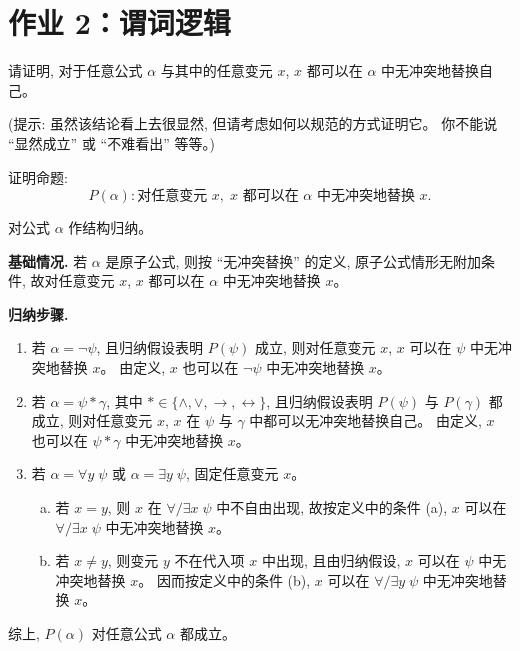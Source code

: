 
\newpage
\section{作业 2：谓词逻辑}

\begin{problem}[一阶谓词逻辑: 替换]
  请证明, 对于任意公式 $\alpha$ 与其中的任意变元 $x$,
  $x$ 都可以在 $\alpha$ 中无冲突地替换自己。

  \noindent (提示: 虽然该结论看上去很显然, 但请考虑如何以规范的方式证明它。
  你不能说 ``显然成立'' 或 ``不难看出'' 等等。)
\end{problem}

\begin{solution}
  证明命题:
  \[
    P(\alpha): \text{对任意变元 } x,\; x \text{ 都可以在 } \alpha \text{ 中无冲突地替换 } x.
  \]

  对公式 $\alpha$ 作结构归纳。

  \textbf{基础情况.}
  若 $\alpha$ 是原子公式, 则按 ``无冲突替换'' 的定义,
  原子公式情形无附加条件, 故对任意变元 $x$,
  $x$ 都可以在 $\alpha$ 中无冲突地替换 $x$。

  \textbf{归纳步骤.}

  \begin{enumerate}[(1)]
    \item 若 $\alpha = \lnot \psi$,
      且归纳假设表明 $P(\psi)$ 成立,
      则对任意变元 $x$,
      $x$ 可以在 $\psi$ 中无冲突地替换 $x$。
      由定义,
      $x$ 也可以在 $\lnot \psi$ 中无冲突地替换 $x$。

    \item 若 $\alpha = \psi \ast \gamma$,
      其中 $\ast \in \{\land, \lor, \to, \leftrightarrow\}$,
      且归纳假设表明 $P(\psi)$ 与 $P(\gamma)$ 都成立,
      则对任意变元 $x$,
      $x$ 在 $\psi$ 与 $\gamma$ 中都可以无冲突地替换自己。
      由定义,
      $x$ 也可以在 $\psi \ast \gamma$ 中无冲突地替换 $x$。

    \item 若 $\alpha = \forall y\; \psi$ 或 $\alpha = \exists y\; \psi$,
      固定任意变元 $x$。

      \begin{enumerate}[(a)]
        \item 若 $x = y$, 则 $x$ 在 $\forall/\exists x\; \psi$ 中不自由出现,
          故按定义中的条件 (a),
          $x$ 可以在 $\forall/\exists x\; \psi$ 中无冲突地替换 $x$。

        \item 若 $x \neq y$, 则变元 $y$ 不在代入项 $x$ 中出现,
          且由归纳假设, $x$ 可以在 $\psi$ 中无冲突地替换 $x$。
          因而按定义中的条件 (b),
          $x$ 可以在 $\forall/\exists y\; \psi$ 中无冲突地替换 $x$。
      \end{enumerate}
  \end{enumerate}
  综上, $P(\alpha)$ 对任意公式 $\alpha$ 都成立。
\end{solution}


